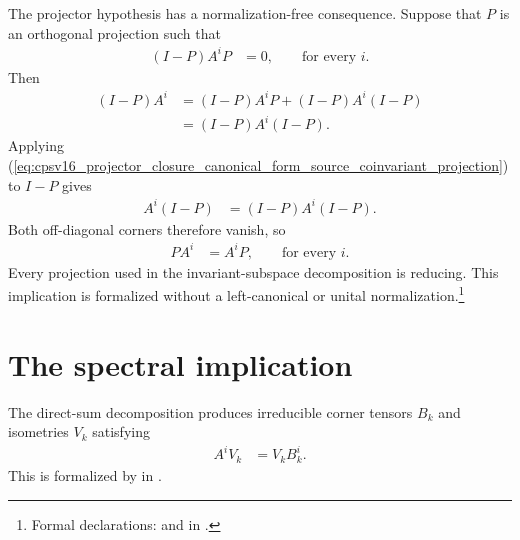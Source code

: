 \documentclass{article}
\begin{document}
The projector hypothesis has a normalization-free consequence. Suppose that
$P$ is an orthogonal projection such that
\begin{align}
    (I-P)A^iP
        &=0,
        \qquad\text{for every }i.
    \label{eq:cpsv16_projector_closure_canonical_form_lower_corner_zero}
\end{align}
Then
\begin{align}
    (I-P)A^i
        &=(I-P)A^iP+(I-P)A^i(I-P)
    \label{eq:cpsv16_projector_closure_canonical_form_complement_expansion}\\
        &=(I-P)A^i(I-P).
    \label{eq:cpsv16_projector_closure_canonical_form_complement_invariance}
\end{align}
Applying
(\ref{eq:cpsv16_projector_closure_canonical_form_source_coinvariant_projection})
to $I-P$ gives
\begin{align}
    A^i(I-P)
        &=(I-P)A^i(I-P).
    \label{eq:cpsv16_projector_closure_canonical_form_complement_coinvariance}
\end{align}
Both off-diagonal corners therefore vanish, so
\begin{align}
    PA^i
        &=A^iP,
        \qquad\text{for every }i.
    \label{eq:cpsv16_projector_closure_canonical_form_reducing_projection}
\end{align}
Every projection used in the invariant-subspace decomposition is reducing.
This implication is formalized without a left-canonical or unital
normalization.\footnote{Formal declarations:
 and
 in
.}

\section{The spectral implication}

The direct-sum decomposition produces irreducible corner tensors $B_k$ and
isometries $V_k$ satisfying
\begin{align}
    A^iV_k
        &=V_kB_k^i.
    \label{eq:cpsv16_projector_closure_canonical_form_corner_intertwining}
\end{align}
This is formalized by
in
.
\end{document}
